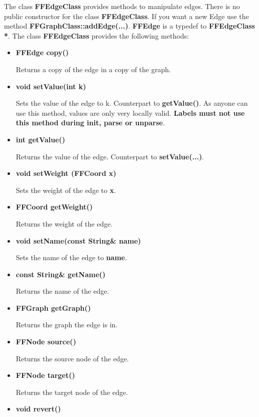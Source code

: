The class {\bf FFEdgeClass} provides methods to manipulate edges.
There is no public constructor for the class {\bf FFEdgeClass}.
If you want a new Edge use the method {\bf
  FFGraphClass::addEdge(...)}. {\bf FFEdge} is a typedef to {\bf
  FFEdgeClass *}.  The class {\bf FFEdgeClass} provides the
following methods:

\begin{itemize}

\item{\bf FFEdge copy()}

Returns a copy of the edge in a copy of the graph.

\item{\bf void setValue(int k)}

Sets the value of the edge to k. Counterpart to {\bf getValue()}.
As anyone can use this method, values are only very locally valid.
{\bf Labels must not use this method during init, parse or unparse}.

\item{\bf int getValue()}

Returns the value of the edge. Counterpart to {\bf setValue(...)}.

\item{\bf void setWeight (FFCoord x)}

Sets the weight of the edge to {\bf x}.

\item{\bf FFCoord getWeight()}

Returns the weight of the edge.

\item{\bf void setName(const String\& name)}

Sets the name of the edge to {\bf name}.

\item{\bf const String\& getName()}

Returns the name of the edge.

\item{\bf FFGraph getGraph()}

Returns the graph the edge is in.

\item{\bf FFNode source()}

Returns the source node of the edge.

\item{\bf FFNode target()}

Returns the target node of the edge.

\item{\bf void revert()}


\end{itemize}
